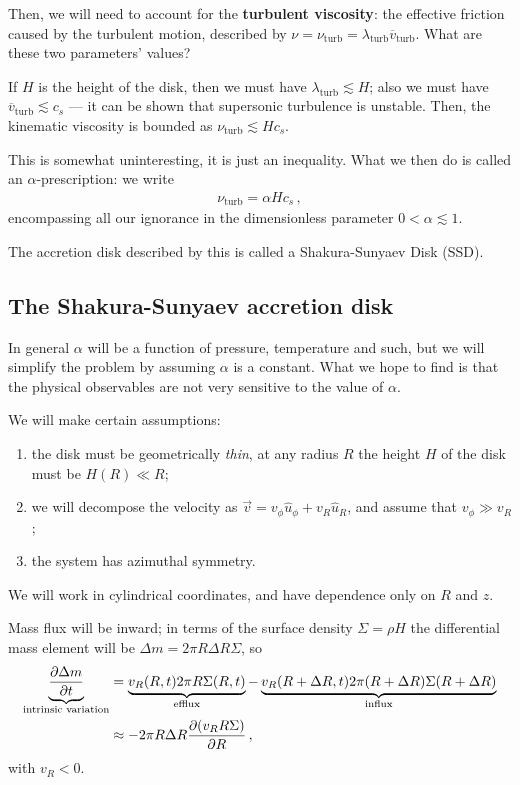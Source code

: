 \documentclass[main.tex]{subfiles}
\begin{document}

Then, we will need to account for the \textbf{turbulent viscosity}: the effective friction caused by the turbulent motion, described by \(\nu = \nu _{\text{turb}} = \lambda _{\text{turb}} \overline{v} _{\text{turb}}\).
What are these two parameters' values?

If \(H\) is the height of the disk, then we must have \(\lambda _{\text{turb}} \lesssim H\); also we must have \(\overline{v} _{\text{turb}} \lesssim c_s\) --- it can be shown that supersonic turbulence is unstable.
Then, the kinematic viscosity is bounded as \(\nu _{\text{turb}} \lesssim H c_s\).

This is somewhat uninteresting, it is just an inequality.
What we then do is called an \(\alpha \)-prescription: we write 
%
\begin{align}
\nu _{\text{turb}} = \alpha H c_s
\,,
\end{align}
%
encompassing all our ignorance in the dimensionless parameter \(0 < \alpha \lesssim 1\). 

The accretion disk described by this is called a Shakura-Sunyaev Disk (SSD). 

\subsection{The Shakura-Sunyaev accretion disk}

In general \(\alpha \) will be a function of pressure, temperature and such, but we will simplify the problem by assuming \(\alpha \) is a constant. 
What we hope to find is that the physical observables are not very sensitive to the value of \(\alpha \). 

We will make certain assumptions: 
\begin{enumerate}
    \item the disk must be geometrically \emph{thin}, at any radius \(R\) the height \(H\) of the disk must be \(H(R) \ll R\);
    \item we will decompose the velocity as \(\vec{v} = v_\phi \hat{u}_\phi + v_R \hat{u}_R\), and assume that \(v_\phi \gg v_R\);
    \item the system has azimuthal symmetry.
\end{enumerate}

We will work in cylindrical coordinates, and have dependence only on \(R\) and \(z\). 

Mass flux will be inward; in terms of the surface density \(\Sigma = \rho H\) the differential mass element will be \(\Delta m = 2 \pi R \Delta R \Sigma \), so
%
\begin{align}
\underbrace{\pdv{\Delta m}{t}}_{\text{intrinsic variation}} &= \underbrace{v_R (R, t) 2 \pi R \Sigma (R, t)}_{\text{efflux}} - \underbrace{v_R (R + \Delta R, t) 2 \pi (R + \Delta R) \Sigma (R + \Delta R)}_{\text{influx}}  \\
&\approx - 2 \pi R \Delta R \pdv{(v_R R \Sigma )}{R}
\,,
\end{align}
%
with \(v_R <0\). 
\end{document}
